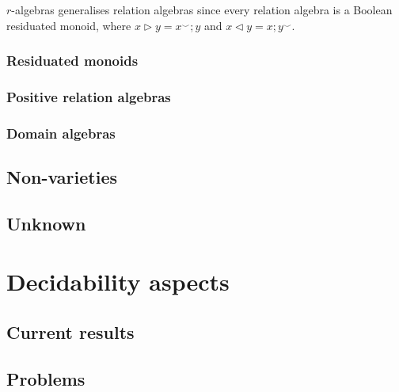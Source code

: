\documentclass[a4paper]{article}
\theoremstyle{defin}
\theoremstyle{theorem}
\theoremstyle{claim}
\theoremstyle{prop}
\theoremstyle{lemma}
\theoremstyle{fact}
\theoremstyle{ex}
\theoremstyle{col}
\begin{document}
$r$-algebras generalises relation algebras since every relation algebra is a Boolean residuated monoid, where $x \triangleright y = x^{\smile} ; y$ and $x \triangleleft y = x ; y^{\smile}$.

\subsubsection{Residuated monoids}

\subsubsection{Positive relation algebras}

\subsubsection{Domain algebras}


\subsection{Non-varieties}
\subsection{Unknown}

\section{Decidability aspects}
\subsection{Current results}
\subsection{Problems}



\end{document}
